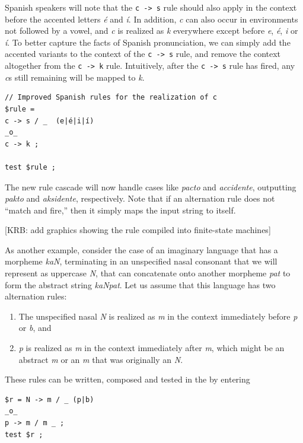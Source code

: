 Spanish speakers will note that the \texttt{c -> s} rule should also apply in the context
before the accented letters
\emph{é} and \emph{í}.  In addition, \emph{c} can also occur in environments not followed by a vowel,
and \emph{c} is realized as \emph{k} everywhere except before \emph{e}, \emph{é}, \emph{i} or \emph{í}.
To better capture the facts of Spanish pronunciation, 
we can simply add the accented variants to the context of the \texttt{c -> s}
rule, and remove the context altogether from the \texttt{c -> k} rule.  Intuitively, after the \texttt{c -> s}
rule has fired, any \emph{c}s still remaining will be mapped to \emph{k}.

\begin{Verbatim}
// Improved Spanish rules for the realization of c
$rule = 
c -> s / _  (e|é|i|í)
_o_
c -> k ;

test $rule ;
\end{Verbatim}

\noindent
The new rule cascade will now handle cases like \emph{pacto} and \emph{accidente},
outputting \emph{pakto} and \emph{aksidente}, respectively.  Note that if an
alternation rule does not ``match and fire,'' then it simply maps the input string to itself.  

[KRB:  add graphics showing the rule compiled into finite-state
machines]

As another example, consider the case of an imaginary language that has a
morpheme \emph{kaN}, terminating in an unspecified nasal consonant that we will
represent as uppercase \emph{N}, that can concatenate onto another morpheme
\emph{pat} to form the abstract string \emph{kaNpat}.  Let us assume that this language
has two alternation rules:

\begin{enumerate}
\item
The unspecified nasal \emph{N} is realized as \emph{m} in the context immediately before \emph{p} or
\emph{b}, and
\item
\emph{p} is realized as \emph{m} in the context immediately after \emph{m}, which might be an abstract
\emph{m} or an \emph{m} that was originally an \emph{N}.
\end{enumerate}

\noindent
These rules can be written, composed and tested in the  by entering


\begin{Verbatim}
$r = N -> m / _ (p|b)
_o_
p -> m / m _ ;
test $r ;
\end{Verbatim}


